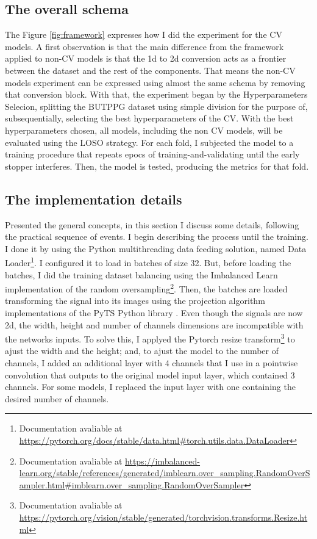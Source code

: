 \subsection{The overall schema}



The Figure \ref{fig:framework} expresses how I did the experiment for the \gls{CV} models. A first observation is that the main difference from the framework applied to non-\gls{CV} models is that the 1d to 2d conversion acts as a frontier between the dataset and the rest of the components. That means the non-\gls{CV} models experiment can be expressed using almost the same schema by removing that conversion block. With that, the experiment began by the Hyperparameters Selecion, splitting the \gls{BUTPPG} dataset using simple division for the purpose of, subsequentially, selecting the best hyperparameters of the \gls{CV}. With the best hyperparameters chosen, all models, including the non \gls{CV} models, will be evaluated using the \gls{LOSO} strategy. For each fold, I subjected the model to a training procedure that repeats epocs of training-and-validating until the early stopper interferes. Then, the model is tested, producing the metrics for that fold.

\subsection{The implementation details}

Presented the general concepts, in this section I discuss some details, following the practical sequence of events. I begin describing the process until the training. I done it by using the Python multithreading data feeding solution, named Data Loader\footnote{Documentation avaliable at \url{https://pytorch.org/docs/stable/data.html\#torch.utils.data.DataLoader}}. I configured it to load in batches of size 32. But, before loading the batches, I did the training dataset balancing using the Imbalanced Learn \cite{ImbalancedLearn} implementation of the random oversampling\footnote{Documentation avaliable at \url{https://imbalanced-learn.org/stable/references/generated/imblearn.over_sampling.RandomOverSampler.html\#imblearn.over_sampling.RandomOverSampler}}. Then, the batches are loaded transforming the signal into its images using the projection algorithm implementations of the PyTS Python library \cite{PyTS}. Even though the signals are now 2d, the width, height and number of channels dimensions are incompatible with the networks inputs. To solve this, I applyed the Pytorch resize transform\footnote{Documentation avaliable at \url{https://pytorch.org/vision/stable/generated/torchvision.transforms.Resize.html}} to ajust the width and the height; and, to ajust the model to the number of channels, I added an additional layer with 4 channels that I use in a pointwise convolution that outputs to the original model input layer, which contained 3 channels. For some models, I replaced the input layer with one containing the desired number of channels.

